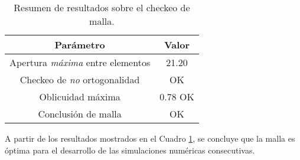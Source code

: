 \begin{table}[h!]
	\centering
	\begin{tabular}{|c|c|}
		\hline
		\textbf{Par\'ametro} & \textbf{Valor} \\ \hline
		Apertura \textit{m\'axima} entre elementos & 21.20 \\ \hline
		Checkeo de \textit{no} ortogonalidad & OK \\ \hline
		Oblicuidad m\'axima & 0.78 OK \\ \hline
		Conclusi\'on de malla & OK \\ \hline
	\end{tabular}
	\caption{Resumen de resultados sobre el checkeo de malla.}
	\label{check}
\end{table}

\noindent
\justify

A partir de los resultados mostrados en el Cuadro \ref{check}, se concluye que la malla es \'optima para el desarrollo de las simulaciones num\'ericas consecutivas.